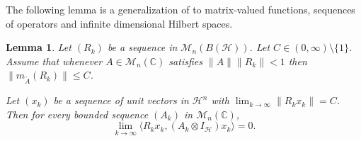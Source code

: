 \documentclass[12pt]{amsart}
\newtheorem{lemma}[theorem]{Lemma}
\theoremstyle{definition}
\newcommand\matn{{\mathcal M}_n}
\newcommand\ta{{\tilde{A}}}
\begin{document}
The following lemma is a generalization of \cite[Theorem 5.1]{CGL17} to matrix-valued functions, sequences of operators and infinite dimensional Hilbert spaces.

\begin{lemma}
  \label{lem:extremal}
  Let $(R_k)$ be a sequence in $\matn(B(\mathcal{H}))$. Let $C \in (0,\infty) \setminus \{1\}$.
  Assume that whenever $A \in \matn(\mathbb{C})$ satisfies $\|A\| \|R_k\| < 1$ then $ \|m_\ta(R_k)\| \le C$.

  Let $(x_k)$ be a sequence of unit vectors in $\mathcal{H}^n$ with $\lim_{k \to \infty} \|R_k x_k\| = C$.
  Then for every bounded sequence $(A_k)$ in $\matn(\mathbb{C})$,
  \begin{equation*}
    \lim_{k \to \infty} \langle R_k x_k, (A_k \otimes I_{\mathcal{H}}) x_k \rangle  =0.
  \end{equation*}
\end{lemma}
\end{document}

